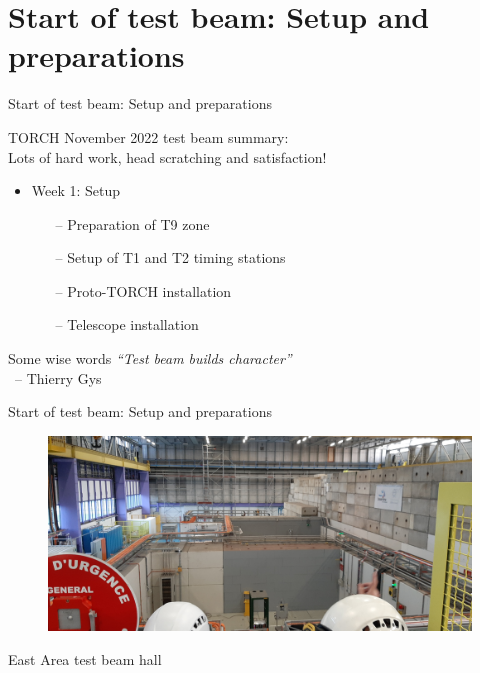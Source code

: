 \documentclass[xcolor = table]{beamer}
\begin{document}
\section{Start of test beam: Setup and preparations}
\begin{frame}{Start of test beam: Setup and preparations}
  \begin{center}
    \large TORCH November 2022 test beam summary:\\Lots of hard work, head scratching and satisfaction!
  \end{center}
  \begin{itemize}
    \setlength\itemsep{1.0em}
    \item{Week 1: Setup}
    \begin{itemize}
      \item[--]{Preparation of T9 zone}
      \item[--]{Setup of T1 and T2 timing stations}
      \item[--]{Proto-TORCH installation}
      \item[--]{Telescope installation}
    \end{itemize}
  \end{itemize}
  \begin{block}{Some wise words}
    \textit{``Test beam builds character''}\\~\quad\quad-- Thierry Gys
  \end{block}
\end{frame}

\begin{frame}{Start of test beam: Setup and preparations}
  \begin{figure}
    \centering
    \includegraphics[width = 1.0\textwidth]{Plots/T9_BirdsView.jpg}
  \end{figure}
  \vspace{-0.2cm}
  \begin{center}
    \large East Area test beam hall
  \end{center}
\end{frame}
\end{document}
